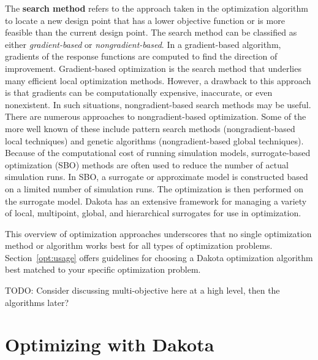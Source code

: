 The {\bf search method} refers to the approach taken in the
optimization algorithm to locate a new design point that has a lower
objective function or is more feasible than the current design point.
The search method can be classified as either \emph{gradient-based} or
\emph{nongradient-based}. In a gradient-based algorithm, gradients of
the response functions are computed to find the direction of
improvement.  Gradient-based optimization is the search method that
underlies many efficient local optimization methods. However, a
drawback to this approach is that gradients can be computationally
expensive, inaccurate, or even nonexistent. In such situations,
nongradient-based search methods may be useful. There are numerous
approaches to nongradient-based optimization. Some of the more well
known of these include pattern search methods (nongradient-based local
techniques) and genetic algorithms (nongradient-based global
techniques).  Because of the computational cost of running simulation
models, surrogate-based optimization (SBO) methods are often used to
reduce the number of actual simulation runs. In SBO, a surrogate or
approximate model is constructed based on a limited number of
simulation runs.  The optimization is then performed on the surrogate
model.  Dakota has an extensive framework for managing a variety of
local, multipoint, global, and hierarchical surrogates for use in
optimization.

This overview of optimization approaches underscores that no single
optimization method or algorithm works best for all types of
optimization problems. Section~\ref{opt:usage} offers guidelines for
choosing a Dakota optimization algorithm best matched to your specific
optimization problem.

TODO: Consider discussing multi-objective here at a high level, then
the algorithms later?

\section{Optimizing with Dakota}\label{opt:dakota}


